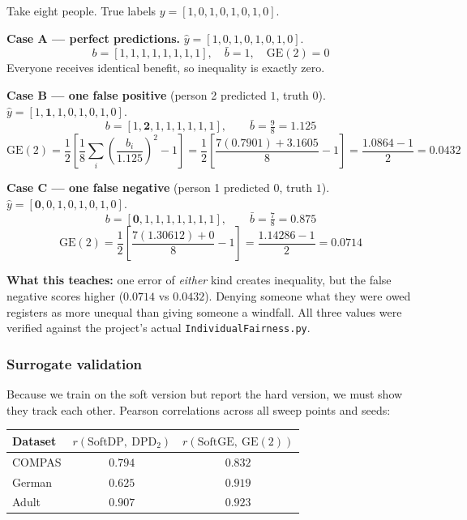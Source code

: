 \documentclass[11pt,a4paper]{article}
\newcommand{\dpdtwo}{\ensuremath{\mathrm{DPD}_{2}}}
\newcommand{\getwo}{\ensuremath{\mathrm{GE}(2)}}
\newcommand{\file}[1]{\textcolor{accent}{\texttt{\small #1}}}
\begin{document}
\begin{example}
Take eight people. True labels
$y = [1,0,1,0,1,0,1,0]$.

\medskip
\textbf{Case A --- perfect predictions.} $\hat y = [1,0,1,0,1,0,1,0]$.
\[ b = [1,1,1,1,1,1,1,1], \quad \bar b = 1, \quad \getwo = 0 \]
Everyone receives identical benefit, so inequality is exactly zero.

\medskip
\textbf{Case B --- one false positive} (person 2 predicted $1$, truth $0$).
$\hat y = [1,\mathbf{1},1,0,1,0,1,0]$.
\[ b = [1,\mathbf{2},1,1,1,1,1,1], \qquad \bar b = \tfrac{9}{8} = 1.125 \]
\[
\getwo = \frac{1}{2}\left[\frac{1}{8}\sum_i\left(\frac{b_i}{1.125}\right)^{2} - 1\right]
       = \frac{1}{2}\left[\frac{7(0.7901) + 3.1605}{8} - 1\right]
       = \frac{1.0864 - 1}{2} = \mathbf{0.0432}
\]

\medskip
\textbf{Case C --- one false negative} (person 1 predicted $0$, truth $1$).
$\hat y = [\mathbf{0},0,1,0,1,0,1,0]$.
\[ b = [\mathbf{0},1,1,1,1,1,1,1], \qquad \bar b = \tfrac{7}{8} = 0.875 \]
\[
\getwo = \frac{1}{2}\left[\frac{7(1.30612) + 0}{8} - 1\right]
       = \frac{1.14286 - 1}{2} = \mathbf{0.0714}
\]

\medskip
\textbf{What this teaches:} one error of \emph{either} kind creates inequality,
but the false negative scores higher ($0.0714$ vs $0.0432$). Denying someone
what they were owed registers as more unequal than giving someone a windfall.
All three values were verified against the project's actual
\file{IndividualFairness.py}.
\end{example}

\subsubsection{Surrogate validation}
Because we train on the soft version but report the hard version, we must show
they track each other. Pearson correlations across all sweep points and seeds:

\begin{center}
\small
\begin{tabular}{@{}lcc@{}}
\toprule
\textbf{Dataset} & $r(\mathrm{SoftDP},\ \dpdtwo)$ & $r(\mathrm{SoftGE},\ \getwo)$ \\
\midrule
COMPAS & $0.794$ & $0.832$ \\
German & $0.625$ & $0.919$ \\
Adult  & $0.907$ & $0.923$ \\
\bottomrule
\end{tabular}
\end{center}
\end{document}
